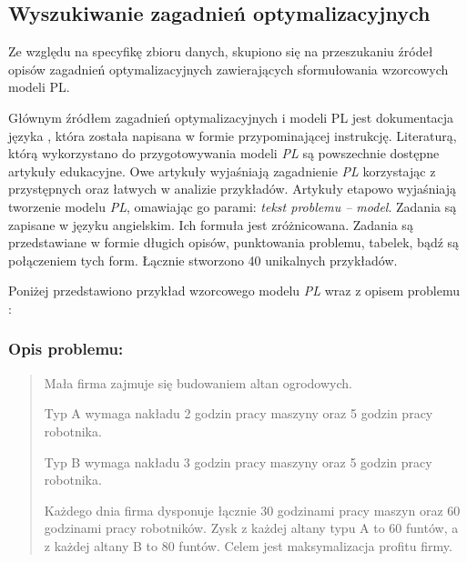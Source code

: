 


\subsection{Wyszukiwanie zagadnień optymalizacyjnych}


Ze względu na specyfikę zbioru danych, skupiono się na przeszukaniu źródeł opisów zagadnień optymalizacyjnych zawierających sformułowania wzorcowych modeli PL.

Głównym źródłem zagadnień optymalizacyjnych i modeli PL jest dokumentacja języka   \cite{zimpl_manual}, która została napisana w formie przypominającej instrukcję. Literaturą, którą wykorzystano do przygotowywania modeli \textit{PL} są powszechnie dostępne artykuły edukacyjne\cite{brilliant_linear,byjus_linear,cimt,arsdcollege2020,libretexts_linear,superprof_linear,toppr_graphical}. Owe artykuły wyjaśniają zagadnienie \textit{PL} korzystając z przystępnych oraz łatwych w analizie przykładów. Artykuły etapowo wyjaśniają tworzenie modelu \textit{PL}, omawiając go parami: \textit{tekst problemu -- model}. Zadania są zapisane w języku angielskim. Ich formuła jest zróżnicowana. Zadania są przedstawiane w formie długich opisów, punktowania problemu, tabelek, bądź są połączeniem tych form. Łącznie stworzono 40 unikalnych przykładów. 

Poniżej przedstawiono przykład wzorcowego modelu \textit{PL} wraz z opisem problemu \cite{cimt}:

\subsubsection*{Opis problemu:} \label{sec:model_example}
\begin{quote}
Mała firma zajmuje się budowaniem altan ogrodowych.

Typ A wymaga nakładu 2 godzin pracy maszyny oraz 5 godzin pracy robotnika.  

Typ B wymaga nakładu 3 godzin pracy maszyny oraz 5 godzin pracy robotnika. 

Każdego dnia firma dysponuje łącznie 30 godzinami pracy maszyn oraz 60 godzinami pracy robotników. Zysk z każdej altany typu A to 60 funtów, a z każdej altany B to 80 funtów. Celem jest maksymalizacja profitu firmy.

\end{quote}


